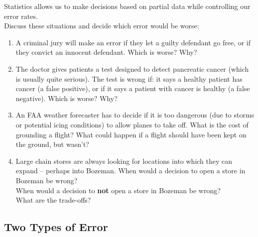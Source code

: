 Statistics allows us to make decisions based on partial data  while
controlling our error rates.\\
Discuss these situations and decide which error would be worse:\vspace{-.6cm}
\begin{enumerate}
\item A criminal jury will make an error if
      they let a guilty defendant go free, or if
      they convict an innocent defendant.
     Which is worse? Why?
\begin{students}
  \vspace{1.5cm}
\end{students}

\item The doctor gives patients a test designed to detect pancreatic
  cancer (which is usually quite serious).  The test is wrong if:
  it says a healthy patient has cancer (a false positive), or if
  it says a patient with cancer is healthy (a false negative).  Which
  is worse?  Why? 
\begin{students}
  \vspace{1.5cm}
\end{students}

\item  An FAA weather forecaster has to decide if it is too dangerous
   (due to storms or potential icing conditions) to allow planes to
   take off.  What is the cost of grounding a flight? What could
   happen if a flight should have been kept on the ground, but wasn't?  
\begin{students}
  \vspace{2.5cm}
\end{students}



\item  Large chain stores are always looking for locations into which
  they can expand -- perhaps into Bozeman. 
  When would a  decision to open a store in Bozeman  be wrong?\\
  When would a decision to {\bf not} open a store in Bozeman  be
  wrong?\\
  What are the trade-offs?  
\begin{students}
  \vspace{3cm}
\end{students}

\end{enumerate}

\subsection{ Two Types of Error }

